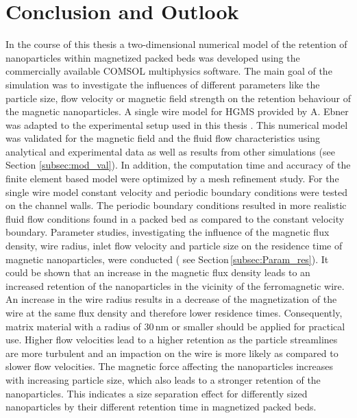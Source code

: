 
\chapter{Conclusion and Outlook}
\label{ch:Conclusion}


In the course of this thesis a two-dimensional numerical model of the retention of nanoparticles within magnetized packed beds was developed using the commercially available COMSOL multiphysics software. The main goal of the simulation was to investigate the influences of different parameters like the particle size, flow velocity or magnetic field strength on the retention behaviour of the magnetic nanoparticles. 
A single wire model for HGMS provided by A. Ebner was adapted to the experimental setup used in this thesis \cite{choomphon2017simulation}. This numerical model was validated for the magnetic field and the fluid flow characteristics using analytical and experimental data as well as results from other simulations (see Section \ref{subsec:mod_val}). In addition, the computation time and accuracy of the finite element based model were optimized by a mesh refinement study. For the single wire model constant velocity and periodic boundary conditions were tested on the channel walls. The periodic boundary conditions resulted in more realistic fluid flow conditions found in a packed bed as compared to the constant velocity boundary. Parameter studies, investigating the influence of the magnetic flux density, wire radius, inlet flow velocity and particle size on the residence time of magnetic nanoparticles, were conducted ( see Section\,\ref{subsec:Param_res}). It could be shown that an increase in the magnetic flux density leads to an increased retention of the nanoparticles in the vicinity of the ferromagnetic wire. An increase in the wire radius results in a decrease of the magnetization of the wire at the same flux density and therefore lower residence times. Consequently, matrix material with a radius of 30\,nm or smaller should be applied for practical use. Higher flow velocities lead to a higher retention as the particle streamlines are more turbulent and an impaction on the wire is more likely as compared to slower flow velocities. The magnetic force affecting the nanoparticles increases with increasing particle size, which also leads to a stronger retention of the nanoparticles. This indicates a size separation effect for differently sized nanoparticles by their different retention time in magnetized packed beds.

